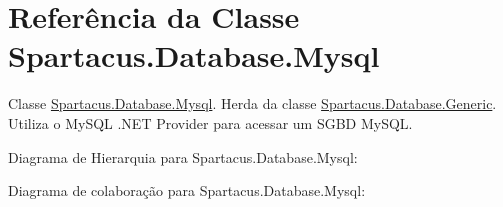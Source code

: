 \hypertarget{classSpartacus_1_1Database_1_1Mysql}{\section{Referência da Classe Spartacus.\+Database.\+Mysql}
\label{classSpartacus_1_1Database_1_1Mysql}
}


Classe \hyperlink{classSpartacus_1_1Database_1_1Mysql}{Spartacus.\+Database.\+Mysql}. Herda da classe \hyperlink{classSpartacus_1_1Database_1_1Generic}{Spartacus.\+Database.\+Generic}. Utiliza o My\+S\+Q\+L .N\+E\+T Provider para acessar um S\+G\+B\+D My\+S\+Q\+L.  




Diagrama de Hierarquia para Spartacus.\+Database.\+Mysql\+:


Diagrama de colaboração para Spartacus.\+Database.\+Mysql\+:
